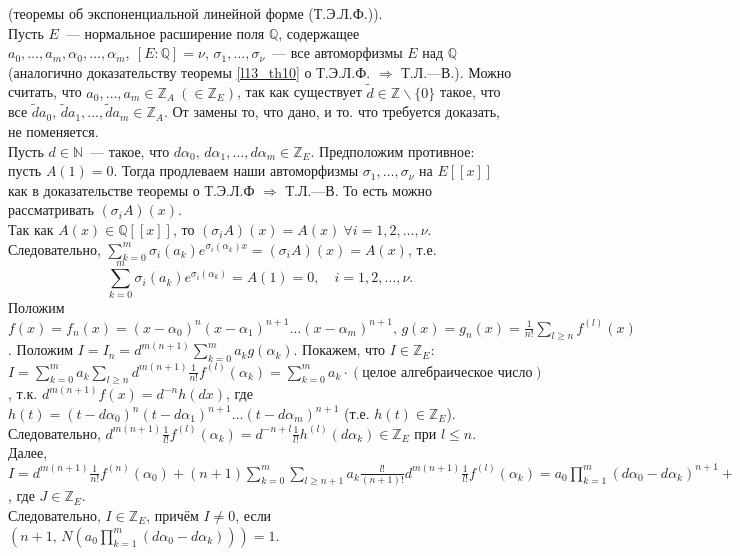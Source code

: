 \begin{pf} (теоремы об экспоненциальной линейной форме (Т.Э.Л.Ф.)).\\
	Пусть $E$ — нормальное расширение поля $\mathbb{Q}$, содержащее $a_0,\dots,a_m,\alpha_0,\dots,\alpha_m, \ [E \colon \mathbb{Q}] = \nu$, $\sigma_1,\dots,\sigma_\nu$ — все автоморфизмы $E$ над $\mathbb{Q}$ (аналогично доказательству теоремы \ref{l13_th10} о Т.Э.Л.Ф. $\Rightarrow$ Т.Л.—В.).
	Можно считать, что $a_0, \dots, a_m \in \mathbb{Z}_A \ (\in \mathbb{Z}_E)$, так как существует $\tilde{d} \in \mathbb{Z} \backslash \{ 0 \}$ такое, что все $\tilde{d}a_0, \, \tilde{d}a_1, \dots, \tilde{d}a_m \in \mathbb{Z}_A$. От замены то, что дано, и то. что требуется доказать, не поменяется.\\
	Пусть $d \in \mathbb{N}$ — такое, что $d\alpha_0, \, d\alpha_1, \dots, d\alpha_m \in \mathbb{Z}_E$. Предположим противное: пусть $A(1)=0$. Тогда продлеваем наши автоморфизмы $\sigma_1, \dots, \sigma_\nu$ на $E[[x]]$ как в доказательстве теоремы о Т.Э.Л.Ф $\Rightarrow$ Т.Л.—В. То есть можно рассматривать $(\sigma_iA)(x)$.\\
	Так как $A(x) \in \mathbb{Q}[[x]]$, то $(\sigma_iA)(x) = A(x) \ \forall i = 1,2,\dots,\nu$. Следовательно, $\displaystyle \sum\limits_{k=0}^m \sigma_i (a_k) e^{\sigma_i(\alpha_k)x} = (\sigma_iA)(x) = A(x)$, т.е.
	$$\sum\limits_{k=0}^m \sigma_i(a_k)e^{\sigma_i(\alpha_k)} = A(1) = 0, \quad i = 1,2,\dots,\nu.$$
	Положим $\displaystyle f(x) = f_n(x) = (x-\alpha_0)^n(x-\alpha_1)^{n+1}\dots(x-\alpha_m)^{n+1}, \, g(x) = g_n(x) = \frac{1}{n!} \sum\limits_{l \geq n} f^{(l)}(x)$.
	Положим $\displaystyle I=I_n = d^{m(n+1)} \sum\limits_{k=0}^m a_kg(\alpha_k)$. Покажем, что $I \in \mathbb{Z}_E$:\\
	$\displaystyle I = \sum\limits_{k=0}^m a_k \sum\limits_{l \geq n} d^{m(n+1)}\frac{1}{n!}f^{(l)}(\alpha_k) = \sum\limits_{k=0}^m a_k \cdot (\text{целое алгебраическое число})$, т.к. $d^{m(n+1)}f(x) = d^{-n}h(dx)$, где $h(t) = (t-d\alpha_0)^n(t-d\alpha_1)^{n+1}\dots(t-d\alpha_m)^{n+1}$ (т.е. $h(t) \in \mathbb{Z}_E$).
	Следовательно, $\displaystyle d^{m(n+1)}\frac{1}{l!}f^{(l)}(\alpha_k) = d^{-n+l}\frac{1}{l!}h^{(l)}(d\alpha_k) \in \mathbb{Z}_E$ при $l \leq n$. Далее,\\
	$\displaystyle I = d^{m(n+1)}\frac{1}{n!}f^{(n)}(\alpha_0) + (n+1)\sum\limits_{k=0}^m\sum\limits_{l \geq n+1} a_k\frac{l!}{(n+1)!}d^{m(n+1)}\frac{1}{l!}f^{(l)}(\alpha_k) = a_0\prod\limits_{k=1}^m (d\alpha_0-d\alpha_k)^{n+1} + (n+1)J$, где $J \in \mathbb{Z}_E$.\\
	Следовательно, $I \in \mathbb{Z}_E$, причём $I \ne 0$, если $\displaystyle \left( n+1, \, N\left( a_0\prod\limits_{k=1}^m(d\alpha_0 - d\alpha_k) \right) \right) = 1$.\\

\end{pf}
